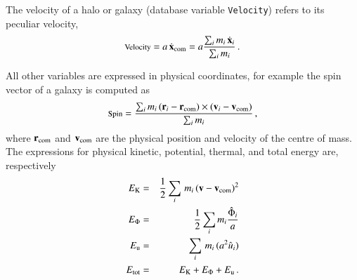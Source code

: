 The velocity of a halo or galaxy (database variable {\tt Velocity}) refers to its peculiar velocity,
\begin{equation}
\hbox{\footnotesize Velocity} = a\,\dot{\bf x}_{\rm com} = a{\sum_i m_i\,\dot{\bf x}_i\over \sum_i m_i}\,.
\label{eq:Velocity}
\end{equation}

All other variables are expressed in physical coordinates, for example the spin vector of a galaxy is computed as
\begin{equation}
\hbox{\footnotesize Spin} = {\sum_i m_i\,({\bf r}_i-{\bf r}_{\rm com})\times ({\bf v}_i-{\bf v}_{\rm com})\over \sum_i m_i}\,,
\end{equation}
where ${\bf r}_{\rm com}$ and ${\bf v}_{\rm com}$ are the physical position and velocity of the centre of mass.
The expressions for physical kinetic, potential, thermal, and total energy are, respectively
\begin{eqnarray}
E_{\rm K} &=&{1\over 2}\sum_i\,m_i\,({\bf v}-{\bf v}_{\rm com})^2 \label{eq:KineticEnergy}\\
E_{\Phi} &=&{1\over 2}\sum_i m_i{\hat\Phi_i\over a} \label{eq:PotentialEnergy}\\
E_{\rm u} &=& \sum_i\,m_i\,(a^2\hat u_i) \label{eq:ThermalEnergy}\\
E_{\rm tot} &=& E_{\rm K}+E_{\Phi}+E_{\rm u}\,. \label{eq:TotalEnergy}
\end{eqnarray}

